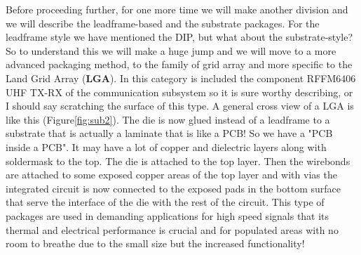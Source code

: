 \documentclass[final]{cubedoc}
\begin{document}
Before proceeding further, for one more time we will make another division and we will describe the leadframe-based and the substrate packages.
For the leadframe style we have mentioned the DIP, but what about the substrate-style? So to understand this we will make a huge jump and we will move to a more advanced packaging method, to the family of grid array and more specific to the Land Grid Array (\textbf{LGA}). In this category is included the component RFFM6406 UHF TX-RX of the communication subsystem so it is sure worthy describing, or I should say scratching the surface of this type. A general cross view of a LGA is like this (Figure\ref{fig:sub2}). The die is now glued instead of a leadframe to a substrate that is actually a laminate that is like a PCB! So we have a "PCB inside a PCB". It may have a lot of copper and dielectric layers along with soldermask to the top. The die is attached to the top layer. Then the wirebonds are attached to some exposed copper areas of the top layer and with vias the integrated circuit is now connected to the exposed pads in the bottom surface that serve the interface of the die with the rest of the circuit. This type of packages are used in demanding applications for high speed signals that its thermal and electrical performance is crucial and for populated areas with no room to breathe due to the small size but the increased functionality! 
\end{document}
